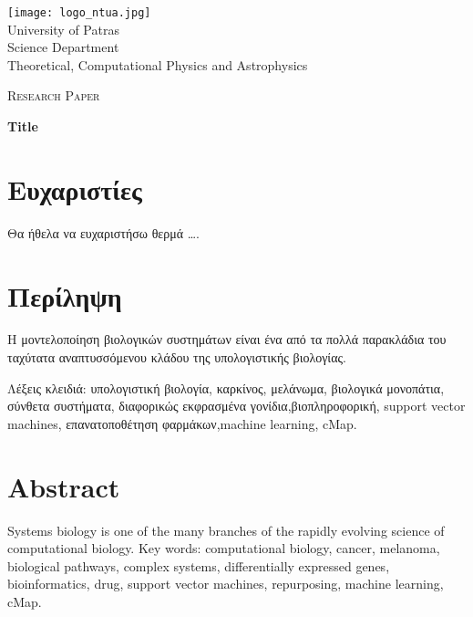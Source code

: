 \documentclass[10pt,a4paper, openany]{book}
\begin{document}
	
\latintext	

\begin{titlepage}
	\centering
	\vspace*{1cm}
	\texttt{[image: logo\_ntua.jpg]}\\[1cm]
	University of Patras \\[5pt]
	Science Department \\[5pt]
	Theoretical, Computational Physics and Astrophysics\\[1cm]
	{\Large\scshape Research Paper \par}
	{\huge\bfseries Title \par}




	\thispagestyle{empty}
\end{titlepage}

\setcounter{page}{1}
\frontmatter	%

\chapter*{Ευχαριστίες} %
Θα ήθελα να ευχαριστήσω θερμά	\ldots .

\chapter*{Περίληψη}
Η μοντελοποίηση βιολογικών συστημάτων είναι ένα από τα πολλά παρακλάδια του ταχύτατα αναπτυσσόμενου κλάδου της υπολογιστικής βιολογίας. 

\vfill  %

Λέξεις κλειδιά: υπολογιστική βιολογία, καρκίνος, μελάνωμα, βιολογικά μονοπάτια, σύνθετα συστήματα, διαφορικώς εκφρασμένα γονίδια,βιοπληροφορική, support vector machines, επανατοποθέτηση φαρμάκων,\latintext machine learning, cMap.



\chapter*{Abstract}
Systems biology is one of the many branches of the rapidly evolving science of computational biology. 
\vfill
Key words: computational biology, cancer, melanoma, biological pathways, complex systems, differentially expressed genes, bioinformatics, drug, support vector machines, repurposing, machine learning, cMap.
\end{document}
